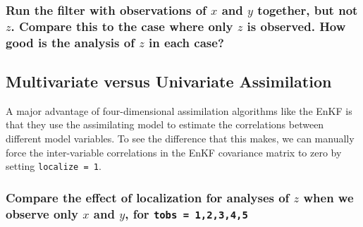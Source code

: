 \subsubsection{Run the filter with observations of $x$ and $y$ together, but not $z$. Compare this to the case where only $z$ is observed. How good is the analysis of $z$ in each case?}  


\subsection{Multivariate versus Univariate Assimilation}

A major advantage of four-dimensional assimilation algorithms like the EnKF is that they use the assimilating model to estimate the correlations between different model variables.
To see the difference that this makes, we can manually force the inter-variable correlations in the EnKF covariance matrix to zero by setting \texttt{localize = 1}. 

\subsubsection{Compare the effect of localization for analyses of $z$ when we observe only $x$ and $y$, for \texttt{tobs = 1,2,3,4,5}}  



